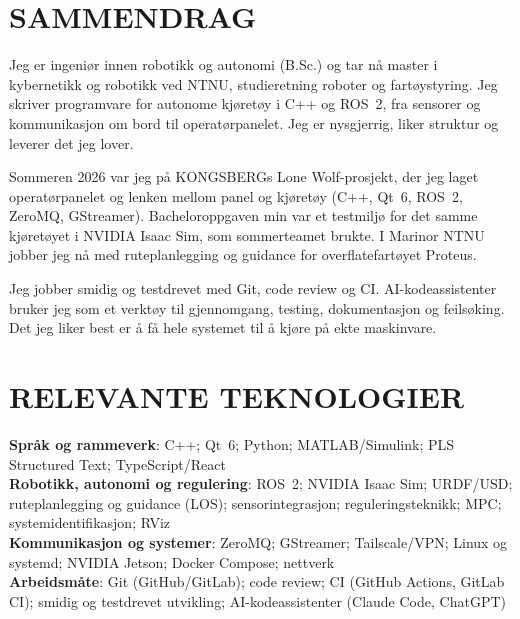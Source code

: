 \documentclass[a4paper,11pt]{article}
\newcommand{\resumeBlockStart}{\begin{itemize}[leftmargin=0in, label={}]}
\newcommand{\resumeBlockEnd}{\end{itemize}}
\begin{document}
\section{SAMMENDRAG}
\resumeBlockStart
  \small{\item{
Jeg er ingeni{\o}r innen robotikk og autonomi (B.Sc.) og tar n{\aa} master i kybernetikk og robotikk ved NTNU, studieretning roboter og fart{\o}ystyring. Jeg skriver programvare for autonome kj{\o}ret{\o}y i C++ og ROS~2, fra sensorer og kommunikasjon om bord til operat{\o}rpanelet. Jeg er nysgjerrig, liker struktur og leverer det jeg lover.
\vspace{2pt}

Sommeren 2026 var jeg p{\aa} KONGSBERGs Lone Wolf-prosjekt, der jeg laget operat{\o}rpanelet og lenken mellom panel og kj{\o}ret{\o}y (C++, Qt~6, ROS~2, ZeroMQ, GStreamer). Bacheloroppgaven min var et testmilj{\o} for det samme kj{\o}ret{\o}yet i NVIDIA Isaac Sim, som sommerteamet brukte. I Marinor NTNU jobber jeg n{\aa} med ruteplanlegging og guidance for overflatefart{\o}yet Proteus.
\vspace{2pt}

Jeg jobber smidig og testdrevet med Git, code review og CI. AI-kodeassistenter bruker jeg som et verkt{\o}y til gjennomgang, testing, dokumentasjon og feils{\o}king. Det jeg liker best er {\aa} f{\aa} hele systemet til {\aa} kj{\o}re p{\aa} ekte maskinvare.
  }}
\resumeBlockEnd

\section{RELEVANTE TEKNOLOGIER}
\resumeBlockStart
  \small{\item{
    \textbf{Spr{\aa}k og rammeverk}{: C++; Qt~6; Python; MATLAB/Simulink; PLS Structured Text; TypeScript/React}\vspace{3pt} \\
    \textbf{Robotikk, autonomi og regulering}{: ROS~2; NVIDIA Isaac Sim; URDF/USD; ruteplanlegging og guidance (LOS); sensorintegrasjon; reguleringsteknikk; MPC; systemidentifikasjon; RViz}\vspace{3pt} \\
    \textbf{Kommunikasjon og systemer}{: ZeroMQ; GStreamer; Tailscale/VPN; Linux og systemd; NVIDIA Jetson; Docker Compose; nettverk}\vspace{3pt} \\
    \textbf{Arbeidsm{\aa}te}{: Git (GitHub/GitLab); code review; CI (GitHub Actions, GitLab CI); smidig og testdrevet utvikling; AI-kodeassistenter (Claude Code, ChatGPT)}
  }}
\resumeBlockEnd
\end{document}
